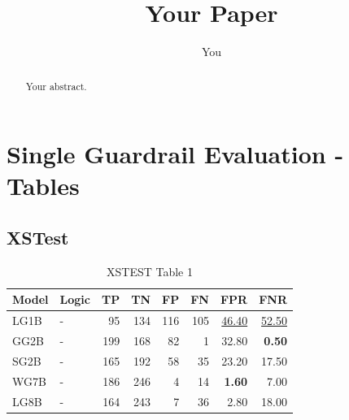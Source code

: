 \documentclass{article}
\title{Your Paper}
\author{You}
\begin{document}
\maketitle

\begin{abstract}
Your abstract.
\end{abstract}

\section{Single Guardrail Evaluation - Tables}

\subsection{XSTest}

\begin{table}[H]
\centering
\begin{tabular}{llrrrrrr}
\toprule
 Model          & Logic   &   TP &   TN &   FP &   FN &   FPR &   FNR \\
\midrule

 LG1B    & -       &   95 &  134 &  116 &  105 & \underline{46.40} & \underline{52.50} \\
 GG2B    & -       &  199 &  168 &   82 &    1 & 32.80             & \textbf{0.50}     \\
 SG2B    & -       &  165 &  192 &   58 &   35 & 23.20             & 17.50             \\
 WG7B    & -       &  186 &  246 &    4 &   14 & \textbf{1.60}     & 7.00              \\
 LG8B    & -       &  164 &  243 &    7 &   36 & 2.80              & 18.00             \\

\bottomrule
\end{tabular}
\caption{\label{tab:widgets}XSTEST Table 1}
\end{table}
\end{document}
